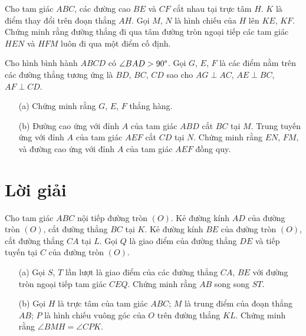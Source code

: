         \boom

        \begin{exercise}
            Cho tam giác \(ABC\), các đường cao \(BE\) và \(CF\) cắt nhau tại trực tâm \(H\). \(K\) là điểm thay đổi trên đoạn thẳng \(AH\). Gọi \(M\), \(N\) là hình chiếu của \(H\) lên \(KE\), \(KF\). Chứng minh rằng đường thẳng đi qua tâm đường tròn ngoại tiếp các tam giác \(HEN\) và \(HFM\) luôn đi qua một điểm cố định.
        \end{exercise}

        \boom

        \begin{exercise}
            Cho hình bình hành \(ABCD\) có \(\angle BAD > 90 \degree\). Gọi \(G\), \(E\), \(F\) là các điểm nằm trên các đường thẳng tương ứng là \(BD\), \(BC\), \(CD\) sao cho \(AG \perp AC\), \(AE \perp BC\), \(AF \perp CD\).
            \begin{enumerate}
                \item[(a)] Chứng minh rằng \(G\), \(E\), \(F\) thẳng hàng.
                \item[(b)] Đường cao ứng với đỉnh \(A\) của tam giác \(ABD\) cắt \(BC\) tại \(M\). Trung tuyến ứng với đỉnh \(A\) của tam giác \(AEF\) cắt \(CD\) tại \(N\). Chứng minh rằng \(EN\), \(FM\), và đường cao ứng với đỉnh \(A\) của tam giác \(AEF\) đồng quy.
            \end{enumerate}
        \end{exercise}

    \newpage

    \section{Lời giải}

        \begin{problem}
            Cho tam giác \(ABC\) nội tiếp đường tròn \((O)\). Kẻ đường kính \(AD\) của đường tròn \((O)\), cắt đường thẳng \(BC\) tại \(K\). Kẻ đường kính \(BE\) của đường tròn \((O)\), cắt đường thẳng \(CA\) tại \(L\). Gọi \(Q\) là giao điểm của đường thẳng \(DE\) và tiếp tuyến tại \(C\) của đường tròn \((O)\).
            \begin{enumerate}
                \item[(a)] Gọi \(S\), \(T\) lần lượt là giao điểm của các đường thẳng \(CA\), \(BE\) với đường tròn ngoại tiếp tam giác \(CEQ\). Chứng minh rằng \(AB\) song song \(ST\).
                \item[(b)] Gọi \(H\) là trực tâm của tam giác \(ABC\); \(M\) là trung điểm của đoạn thẳng \(AB\); \(P\) là hình chiếu vuông góc của \(O\) trên đường thẳng \(KL\). Chứng minh rằng \(\angle BMH = \angle CPK\).
            \end{enumerate}
        \end{problem}

